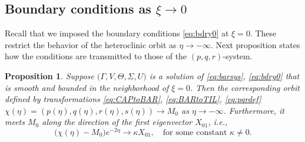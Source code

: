 \documentclass[a4paper,11pt]{article}
\newtheorem{proposition}{Proposition}[section]
\begin{document}
\subsection{Boundary conditions as $\xi \rightarrow 0$}
Recall that we imposed the boundary conditions \eqref{eq:bdry0} at $\xi=0$. These restrict the behavior of the heteroclinic orbit as $\eta \rightarrow -\infty$. Next proposition states how the conditions are transmitted to those of the $(p,q,r)$-system.

\begin{proposition} \label{prop1}
    Suppose $\big(\Gamma,V,\Theta,\Sigma,U\big)$ is a solution of \eqref{eq:barsys}, \eqref{eq:bdry0} that is smooth and bounded in the neighborhood of $\xi=0$. Then the corresponding orbit defined by transformations \eqref{eq:CAPtoBAR}, \eqref{eq:BARtoTIL}, \eqref{eq:pqrdef} $\chi(\eta) = (p(\eta), q(\eta), r(\eta),s(\eta)) \rightarrow M_0$ as $\eta \rightarrow -\infty$. Furthermore, it meets $M_0$ along the direction of the first eigenvector $X_{01}$, i.e.,
    \begin{equation} \label{eq:alpha}
     \big(\chi(\eta) - M_0 \big)e^{-2\eta} \rightarrow \kappa X_{01}, \quad \text{for some constant $\kappa\ne0$.}
    \end{equation}
\end{proposition}
\end{document}
